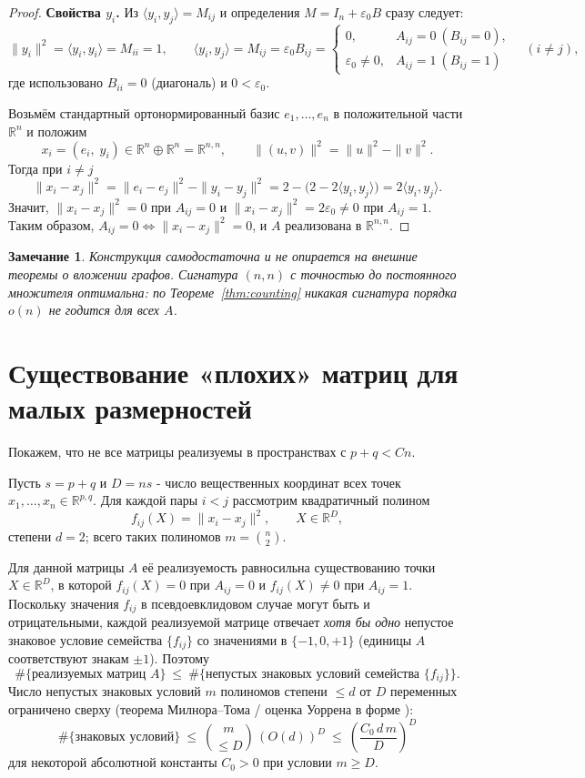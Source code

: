 \documentclass[12pt]{article}
\newtheorem{remark}{Замечание}
\newcommand{\R}{\mathbb{R}}
\begin{document}
\begin{proof}
\textbf{Свойства \(y_i\).} Из \(\langle y_i,y_j\rangle=M_{ij}\) и определения \(M=I_n+\varepsilon_0 B\) сразу следует:
\[
\|y_i\|^2=\langle y_i,y_i\rangle = M_{ii}=1,\qquad
\langle y_i,y_j\rangle = M_{ij} = \varepsilon_0 B_{ij} =
\begin{cases}
0, & A_{ij}=0\ (B_{ij}=0),\\
\varepsilon_0\ne 0, & A_{ij}=1\ (B_{ij}=1)
\end{cases}
\quad (i\ne j),
\]
где использовано \(B_{ii}=0\) (диагональ) и \(0<\varepsilon_0\).

Возьмём стандартный ортонормированный базис \(e_1,\dots,e_n\) в положительной части \(\R^n\) и положим
\[
x_i = (e_i,\; y_i) \in \R^{n}\oplus\R^{n} = \R^{n,n},\qquad
\|(u,v)\|^2 = \|u\|^2-\|v\|^2 .
\]
Тогда при \(i\ne j\)
\[
\|x_i - x_j\|^2 = \|e_i-e_j\|^2 - \|y_i-y_j\|^2
= 2 - \bigl(2 - 2\langle y_i,y_j\rangle\bigr) = 2\langle y_i,y_j\rangle .
\]
Значит, \(\|x_i-x_j\|^2 = 0\) при \(A_{ij}=0\) и \(\|x_i-x_j\|^2 = 2\varepsilon_0 \ne 0\) при \(A_{ij}=1\). Таким образом, \(A_{ij}=0\iff\|x_i-x_j\|^2=0\), и \(A\) реализована в \(\R^{n,n}\).
\end{proof}

\begin{remark}
Конструкция самодостаточна и не опирается на внешние теоремы о вложении графов. Сигнатура \((n,n)\) с точностью до постоянного множителя оптимальна: по Теореме~\ref{thm:counting} никакая сигнатура порядка \(o(n)\) не годится для всех \(A\).
\end{remark}

\section{Существование «плохих» матриц для малых размерностей}

Покажем, что не все матрицы реализуемы в пространствах с \(p+q < C n\).

Пусть \(s = p+q\) и \(D = n s\) - число вещественных координат всех точек \(x_1,\dots,x_n\in\R^{p,q}\). Для каждой пары \(i<j\) рассмотрим квадратичный полином
\[
f_{ij}(X) = \|x_i - x_j\|^2,\qquad X\in\R^{D},
\]
степени \(d=2\); всего таких полиномов \(m = \binom n2\).

Для данной матрицы \(A\) её реализуемость равносильна существованию точки \(X\in\R^D\), в которой \(f_{ij}(X)=0\) при \(A_{ij}=0\) и \(f_{ij}(X)\ne 0\) при \(A_{ij}=1\). Поскольку значения \(f_{ij}\) в псевдоевклидовом случае могут быть и отрицательными, каждой реализуемой матрице отвечает \emph{хотя бы одно} непустое знаковое условие семейства \(\{f_{ij}\}\) со значениями в \(\{-1,0,+1\}\) (единицы \(A\) соответствуют знакам \(\pm1\)). Поэтому
\[
\#\{\text{реализуемых матриц } A\}\ \le\ \#\{\text{непустых знаковых условий семейства } \{f_{ij}\}\}.
\]
Число непустых знаковых условий \(m\) полиномов степени \(\le d\) от \(D\) переменных ограничено сверху (теорема Милнора--Тома / оценка Уоррена в форме \cite[гл.~7]{BasuPollackRoy}):
\[
\#\{\text{знаковых условий}\}\ \le\ \binom{m}{\le D}\,(O(d))^{D}\ \le\ \left(\frac{C_0\, d\, m}{D}\right)^{D}
\]
для некоторой абсолютной константы \(C_0>0\) при условии \(m \ge D\).
\end{document}
